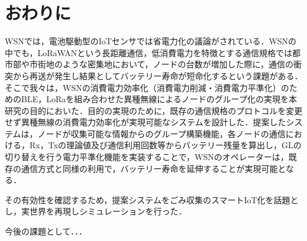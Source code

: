 \documentclass[Japanese]{dicomopapers}
\begin{document}
\section{おわりに}
WSNでは，電池駆動型のIoTセンサでは省電力化の議論がされている．WSNの中でも，LoRaWANという長距離通信，低消費電力を特徴とする通信規格では都市部や市街地のような密集地において，ノードの台数が増加した際に，通信の衝突から再送が発生し結果としてバッテリー寿命が短命化するという課題がある．そこで我々は，WSNの消費電力効率化（消費電力削減・消費電力平準化）のためのBLE，LoRaを組み合わせた異種無線によるノードのグループ化の実現を本研究の目的においた．目的の実現のために，既存の通信規格のプロトコルを変更せず異種無線の消費電力効率化が実現可能なシステムを設計した．提案したシステムは，ノードが収集可能な情報からのグループ構築機能，各ノードの通信における，Rx，Txの理論値及び通信利用回数等からバッテリー残量を算出し，GLの切り替えを行う電力平準化機能を実装することで，WSNのオペレーターは，既存の通信方式と同様の利用で，バッテリー寿命を延伸することが実現可能となる．
\par
その有効性を確認するため，提案システムをごみ収集のスマートIoT化を話題とし，実世界を再現しシミュレーションを行った．
\par
今後の課題として．．．
\end{document}
